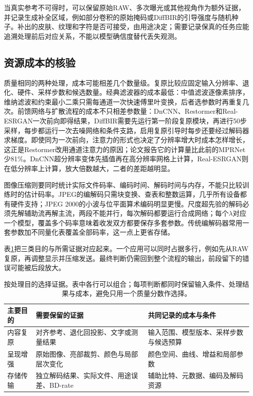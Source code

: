 当真实参考不可得时，可以保留原始RAW、多次曝光或其他视角作为额外证据，并记录生成补全区域，例如部分卷积的原始掩码或DiffBIR的引导强度与随机种子。补出的皮肤、纹理和字符是否可接受，由用途决定；需要记录保真的任务应能追溯处理前后对应关系，不能以模型确信度替代丢失观测。

\subsection{资源成本的核验}
\label{sec:vision-restoration-resources}

质量相同的两种处理，成本可能相差几个数量级。复原比较应固定输入分辨率、退化、硬件、采样步数和候选数量。经典滤波器的成本最低：中值滤波逐像素排序，维纳滤波和约束最小二乘只需每通道一次快速傅里叶变换，后者选参数时再重复几次。前馈网络与扩散流程的成本不只相差参数量：DnCNN、Restormer和Real-ESRGAN一次前向即得结果，DiffBIR需要先运行第一阶段复原模块，再进行50步采样，每步都运行一次去噪网络和条件支路，启用复原引导时每步还要经过解码器求梯度。即使同为一次前向，注意力的形式也决定了分辨率增大时成本怎样增长，这正是Restormer改用通道注意力的原因；论文报告它的计算量比此前的MPRNet少81\%。DnCNN超分辨率变体先插值再在高分辨率网格上计算，Real-ESRGAN则在低分辨率上计算，放大倍数越大，二者的差距越明显。

图像压缩则要同时统计实际文件码率、编码时间、解码时间与内存，不能只比较训练时的估计码率。JPEG的编解码只需块变换、查表和整数运算，几乎所有设备都有硬件支持；JPEG 2000的小波与位平面算术编码明显更慢。尺度超先验的解码必须先解辅助流再解主流，两段不能并行，每次解码都要运行合成网络；每个$\lambda$对应一个模型，覆盖多个码率意味着收发双方都要保存多套参数。传统编解码器常用一套参数加不同量化表覆盖全部码率，这一点上更省存储。

表\ref{tab:vision-restoration-choice}把三类目的与所需证据对应起来。一个应用可以同时占据多行，例如先从RAW复原，再调整显示并压缩发送。最终判断仍需回到整个流程的输出，前段留下的错误可能被后段放大。

\begin{table}[htbp]
 \centering
 \small
 \begin{tabularx}{\linewidth}{@{}p{18mm}XX@{}}
  \toprule
  主要目的 & 需要保留的证据 & 共同记录的成本与条件\\
  \midrule
  内容复原 & 对齐参考、退化回投影、文字或测量结果 & 输入范围、模型版本、采样步数与候选预算\\
  呈现增强 & 原始图像、亮部裁剪、颜色与局部层次变化 & 颜色空间、曲线、增益和局部参数\\
  存储传输 & 独立解码结果、实际文件、用途误差、BD-rate & 辅助比特、元数据、编码及解码资源\\
  \bottomrule
 \end{tabularx}
 \caption{按处理目的选择证据。表中各行可以组合；每项判断都同时保留输入条件、处理结果与成本，避免只用一个质量分数作选择。}
 \label{tab:vision-restoration-choice}
\end{table}

